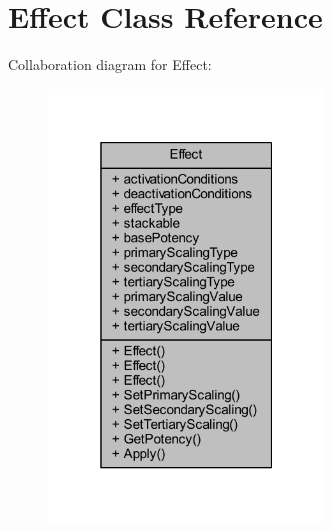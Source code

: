 \hypertarget{class_effect}{}\section{Effect Class Reference}
\label{class_effect}


Collaboration diagram for Effect\+:\nopagebreak
\begin{figure}[H]
\begin{center}
\leavevmode
\includegraphics[width=208pt]{class_effect__coll__graph}
\end{center}
\end{figure}
